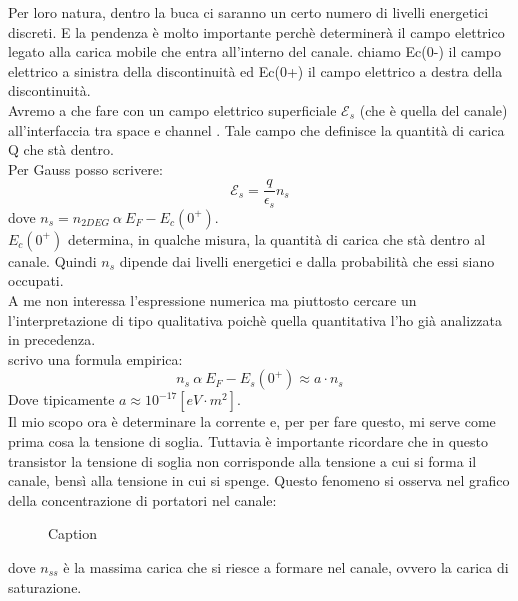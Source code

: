 Per loro natura, dentro la buca ci saranno un certo numero di livelli energetici discreti.
E la pendenza è  molto importante perchè determinerà il campo elettrico legato alla carica mobile che entra all'interno del canale.
chiamo Ec(0-) il campo elettrico a sinistra della discontinuità ed Ec(0+) il campo elettrico a destra della discontinuità.\\

Avremo a che fare con un campo elettrico superficiale $\mathcal{E}_s$ (che è quella del canale) all'interfaccia tra space e channel . Tale campo che definisce la quantità di carica Q che stà dentro.\\
Per Gauss posso scrivere:
\begin{equation}
    \mathcal{E}_s=\dfrac{q}{\epsilon_s} n_s
\end{equation}
dove $n_s=n_{2DEG} \ \alpha \ E_F-E_c(0^+)$.\\
$E_c(0^+)$ determina, in qualche misura, la quantità di carica che stà dentro al canale. Quindi $n_s$ dipende dai livelli energetici e dalla probabilità che essi siano occupati.\\

A me non interessa l'espressione numerica ma piuttosto cercare un l'interpretazione di tipo qualitativa poichè quella quantitativa l'ho già analizzata in precedenza.\\

scrivo una formula empirica:
\begin{equation}
    n_s \ \alpha \ E_F -E_s(0^+) \approx a \cdot n_s
\end{equation}
Dove tipicamente $a \approx{10^{-17}[eV\cdot m^2]}$.\\

Il mio scopo ora è determinare la corrente e, per per fare questo, mi serve come prima cosa la tensione di soglia. Tuttavia è importante ricordare che in questo transistor la tensione di soglia non corrisponde alla tensione a cui si forma il canale, bensì alla tensione in cui si spenge. Questo fenomeno si osserva nel grafico della concentrazione di portatori nel canale:
\begin{figure}[hbt!]
    \centering
    \caption{Caption}
    \label{fig:enter-label}
\end{figure}
dove $n_{ss}$ è la massima carica che si riesce a formare nel canale, ovvero la carica di saturazione.\\

